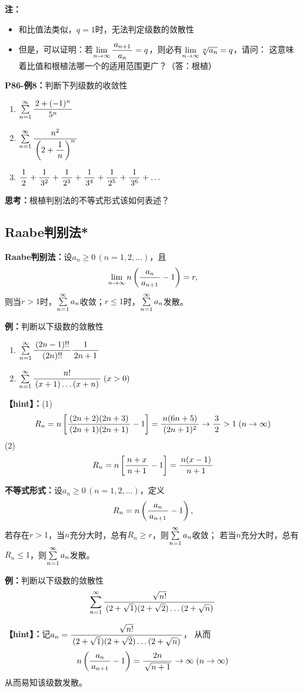 {\bf 注：}
\begin{itemize}
  \setlength{\itemindent}{1cm}
  \item 和比值法类似，$q=1$时，无法判定级数的敛散性
  \item
  但是，可以证明：若$\limn\df{a_{n+1}}{a_n}=q$，则必有$\limn\sqrt[n]{a_n}=q$，请问：
  这意味着比值和根植法哪一个的适用范围更广？（答：根植）
\end{itemize}

{\bf P86-例8：}判断下列级数的收敛性
\begin{enumerate} [(1)]
  \setlength{\itemindent}{1cm}
  \item $\sumn\df{2+(-1)^n}{5^n}$
  \item $\sumn\df{n^2}{\left(2+\df 1n\right)^n}$
  \item $\df 12+\df 1{3^2}+\df 1{2^3}+\df 1{3^4}+\df 1{2^5}+\df 1{3^6}+\ldots$
\end{enumerate}

{\bf 思考：}根植判别法的不等式形式该如何表述？

\begin{shaded}

\subsection{Raabe判别法*}

{\bf Raabe判别法：}设$a_n\geq 0\,(n=1,2,\ldots)$，且
$$\limn n\left(\df{a_n}{a_{n+1}}-1\right)=r,$$
则当$r>1$时，$\sumn a_n$收敛；$r\leq 1$时，$\sumn a_n$发散。	

{\bf 例：}判断以下级数的敛散性
\begin{enumerate}[(1)]
  \setlength{\itemindent}{1cm}
  \item $\sumn\df{(2n-1)!!}{(2n)!!}\df 1{2n+1}$
  \item $\sumn\df{n!}{(x+1)\ldots(x+n)}\;(x>0)$
\end{enumerate}

{\bf 【hint】：}(1)
$$R_n=n\left[\df{(2n+2)(2n+3)}{(2n+1)(2n+1)}-1\right]
=\df{n(6n+5)}{(2n+1)^2}\to\df32>1\;(n\to\infty)$$
(2)
$$R_n=n\left[\df{n+x}{n+1}-1\right]=\df{n(x-1)}{n+1}$$

{\bf 不等式形式：}设$a_n\geq 0\,(n=1,2,\ldots)$，定义
$$R_n=n\left(\df{a_n}{a_{n+1}}-1\right),$$
若存在$r>1$，当$n$充分大时，总有$R_n\geq r$，则$\sumn a_n$收敛；
若当$n$充分大时，总有$R_n\leq 1$，则$\sumn a_n$发散。

{\bf 例：}判断以下级数的敛散性
$$\sumn\df{\sqrt{n!}}{(2+\sqrt 1)(2+\sqrt 2)\ldots(2+\sqrt n)}$$

{\bf 【hint】：}记$a_n=\df{\sqrt{n!}}{(2+\sqrt 1)(2+\sqrt 2)\ldots(2+\sqrt n)}$，
从而
$$n\left(\df{a_n}{a_{n+1}}-1\right)=\df{2n}{\sqrt{n+1}}\to\infty\;(n\to\infty)$$
从而易知该级数发散。

\end{shaded}


